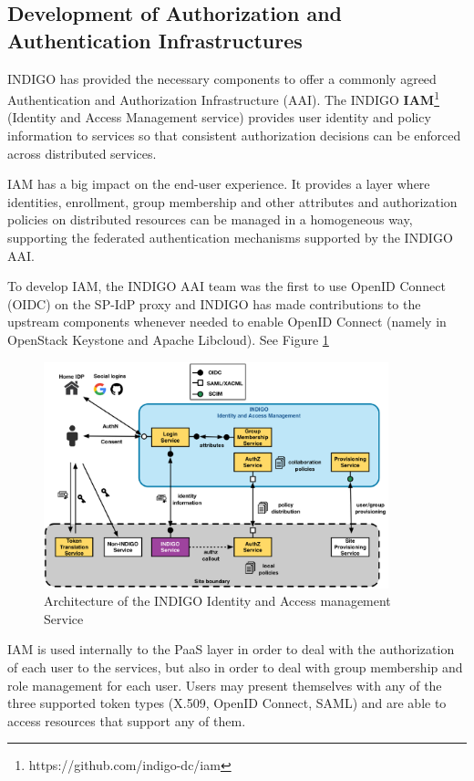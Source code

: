 \documentclass{article}
\begin{document}
\subsection{Development of Authorization and Authentication Infrastructures}
\label{sec:iam}

INDIGO  has  provided  the  necessary components to offer  a commonly  agreed  Authentication  and  Authorization  Infrastructure  (AAI). The INDIGO {\bf IAM}\footnote{https://github.com/indigo-dc/iam} (Identity and Access Management service) provides user identity and policy information to services so that consistent authorization decisions can be enforced across distributed services.

IAM has a big impact on the end-user experience. It provides a layer where identities, enrollment, group membership and other attributes and authorization policies on distributed resources can be managed in a homogeneous way, supporting the federated authentication mechanisms supported by the INDIGO AAI. 

To develop IAM, the INDIGO  AAI  team  was  the  first  to  use  OpenID  Connect (OIDC) on  the  SP-IdP  proxy  and INDIGO has made  contributions  to  the  upstream  components  whenever  needed  to  enable OpenID  Connect (namely  in  OpenStack  Keystone  and  Apache  Libcloud). See Figure \ref{fig:0}



\begin{figure}
  \centering
  \includegraphics[width=10cm]{./figs/Figure0.pdf}
  \caption{Architecture of the INDIGO Identity and Access management Service}
  \label{fig:0}
\end{figure}


IAM is used internally to the PaaS layer in order to deal with the authorization of each user to the services, but also in order to deal with group membership and role management for each user. Users may present themselves with any of the three supported token types (X.509, OpenID Connect, SAML) and are able to access resources that support any of them. 
\end{document}
